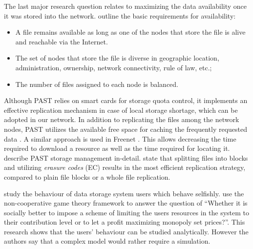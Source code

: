 The last major research question relates to maximizing the data
availability once it was stored into the network.
\citet{past} outline the basic requirements for availability:

\begin{itemize}
\item A file remains available as long as one of the nodes that
      store the file is alive and reachable via the Internet.
\item The set of nodes that store the file is diverse in geographic
      location, administration, ownership, network connectivity, rule
      of law, etc.;
\item The number of files assigned to each node is balanced.
\end{itemize}

Although PAST relies on smart cards for storage quota control, it
implements an effective replication mechanism in case of local
storage shortage, which can be adopted in our network. In addition
to replicating the files among the network nodes, PAST utilizes the
available free space for caching the frequently requested data
\citep{past-caching}. A similar approach is used in Freenet
\citep{freenet}. This allows decreasing the time required to download
a resource as well as the time required for locating it.
\citet{past-caching} describe PAST storage management in-detail.
\citet{p2p-replication-strategy} state that splitting files into
blocks and utilizing \emph{erasure codes} (EC) results in the
most efficient replication strategy, compared to plain file blocks
or a whole file replication.

\citet{selfish-p2p} study the behaviour of \pp data storage system
users which behave selfishly. \citet{selfish-p2p} use the non-cooperative
game theory framework to answer the question of
``Whether it is socially better to
impose a scheme of limiting the users resources in the system
to their contribution level or to let a profit maximizing
monopoly set prices?''. This research shows that the users' behaviour
can be studied analytically. However the authors say that a complex
model would rather require a simulation.



